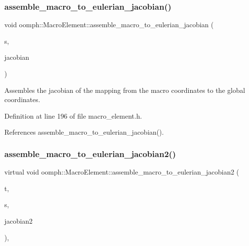 \subsubsection{\texorpdfstring{assemble\+\_\+macro\+\_\+to\+\_\+eulerian\+\_\+jacobian()}{assemble\_macro\_to\_eulerian\_jacobian()}\hspace{0.1cm}{\footnotesize\ttfamily [2/2]}}
{\footnotesize\ttfamily void oomph\+::\+Macro\+Element\+::assemble\+\_\+macro\+\_\+to\+\_\+eulerian\+\_\+jacobian (\begin{DoxyParamCaption}\item[{const \hyperlink{classoomph_1_1Vector}{Vector}$<$ double $>$ \&}]{s,  }\item[{\hyperlink{classoomph_1_1DenseMatrix}{Dense\+Matrix}$<$ double $>$ \&}]{jacobian }\end{DoxyParamCaption})\hspace{0.3cm}{\ttfamily [inline]}}



Assembles the jacobian of the mapping from the macro coordinates to the global coordinates. 



Definition at line 196 of file macro\+\_\+element.\+h.



References assemble\+\_\+macro\+\_\+to\+\_\+eulerian\+\_\+jacobian().

\mbox{\label{classoomph_1_1MacroElement_a3c898b6deef9f8bfcc957313030a3e68}} 
\subsubsection{\texorpdfstring{assemble\+\_\+macro\+\_\+to\+\_\+eulerian\+\_\+jacobian2()}{assemble\_macro\_to\_eulerian\_jacobian2()}\hspace{0.1cm}{\footnotesize\ttfamily [1/2]}}
{\footnotesize\ttfamily virtual void oomph\+::\+Macro\+Element\+::assemble\+\_\+macro\+\_\+to\+\_\+eulerian\+\_\+jacobian2 (\begin{DoxyParamCaption}\item[{const unsigned \&}]{t,  }\item[{const \hyperlink{classoomph_1_1Vector}{Vector}$<$ double $>$ \&}]{s,  }\item[{\hyperlink{classoomph_1_1DenseMatrix}{Dense\+Matrix}$<$ double $>$ \&}]{jacobian2 }\end{DoxyParamCaption})\hspace{0.3cm}{\ttfamily [inline]}, {\ttfamily [virtual]}}



